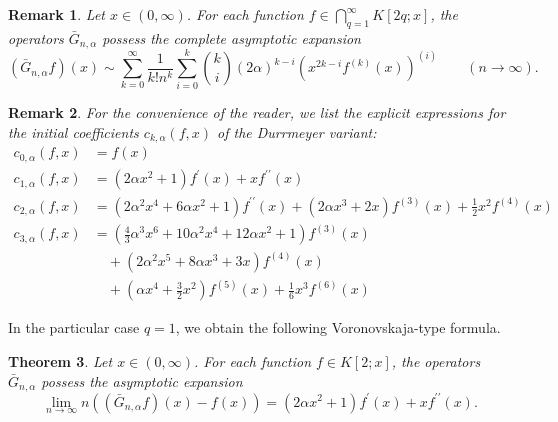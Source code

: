 \documentclass[11pt,a4paper]{article}
\newtheorem{theorem}{Theorem}
\newtheorem{remark}[theorem]{Remark}
\begin{document}
\begin{remark}
Let $x\in \left( 0,\infty \right) $. For each function $f\in
\bigcap_{q=1}^{\infty }K\left[ 2q;x\right] $, the operators $\bar{G}%
_{n,\alpha }$ possess the complete asymptotic expansion 
\begin{equation*}
\left( \bar{G}_{n,\alpha }f\right) \left( x\right) \sim \sum_{k=0}^{\infty }%
\frac{1}{k!n^{k}}\sum_{i=0}^{k}\binom{k}{i}\left( 2\alpha \right)
^{k-i}\left( x^{2k-i}f^{\left( k\right) }\left( x\right) \right) ^{\left(
i\right) }\qquad \left( n\rightarrow \infty \right) .
\end{equation*}
\end{remark}

\begin{remark}
For the convenience of the reader, we list the explicit expressions for the
initial coefficients $c_{k,\alpha }\left( f,x\right) $ of the Durrmeyer
variant: 
\begin{align*}
c_{0,\alpha }\left( f,x\right) & =f(x) \\[0.5em]
c_{1,\alpha }\left( f,x\right) & =\left( 2\alpha x^{2}+1\right) f^{\prime
}(x)+xf^{\prime \prime }(x) \\[0.5em]
c_{2,\alpha }\left( f,x\right) & =\left( 2\alpha ^{2}x^{4}+6\alpha
x^{2}+1\right) f^{\prime \prime }(x)+\left( 2\alpha x^{3}+2x\right)
f^{(3)}(x)+\frac{1}{2}x^{2}f^{(4)}(x) \\[0.5em]
c_{3,\alpha }\left( f,x\right) & =\left( \frac{4}{3}\alpha
^{3}x^{6}+10\alpha ^{2}x^{4}+12\alpha x^{2}+1\right) f^{(3)}(x) \\
& \quad +\left( 2\alpha ^{2}x^{5}+8\alpha x^{3}+3x\right) f^{(4)}(x) \\
& \quad +\left( \alpha x^{4}+\frac{3}{2}x^{2}\right) f^{(5)}(x)+\frac{1}{6}%
x^{3}f^{(6)}(x)
\end{align*}
\end{remark}

In the particular case $q=1$, we obtain the following Voronovskaja-type
formula.

\begin{theorem}
Let $x\in \left( 0,\infty \right) $. For each function $f\in K\left[ 2;x%
\right] $, the operators $\bar{G}_{n,\alpha }$ possess the asymptotic
expansion 
\begin{equation*}
\lim_{n\rightarrow \infty }n\left( \left( \bar{G}_{n,\alpha }f\right) \left(
x\right) -f\left( x\right) \right) =\left( 2\alpha x^{2}+1\right) f^{\prime
}\left( x\right) +xf^{\prime \prime }\left( x\right) .
\end{equation*}
\end{theorem}
\end{document}
